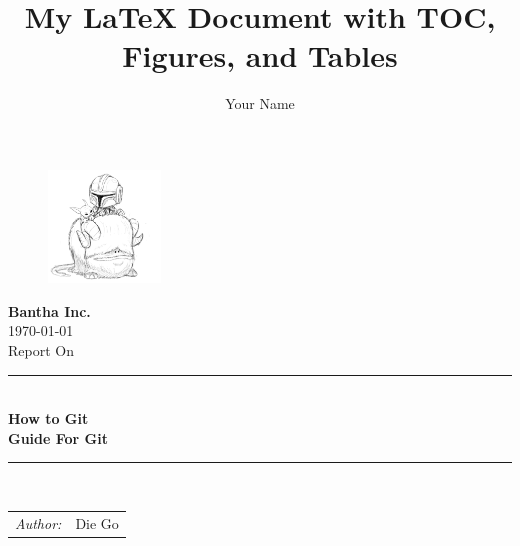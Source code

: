 \documentclass{article} %
\title{My LaTeX Document with TOC, Figures, and Tables}
\author{Your Name}
\begin{document}

\clearpage
{}
\setcounter{page}{1}

\begin{figure}
	\centering
	\includegraphics[width=3cm]{Fun_pics/bantha_inc.jpg}
\end{figure}

\begin{center}
	\textbf{\LARGE Bantha Inc.} \\
	\vspace{1cm}
	\Large \today \\
	\vspace{0.3cm}
	\large Report  On\\

	\rule{\linewidth}{0.5pt} \\
	\vspace{0.2cm}
	\textbf{\LARGE How to Git \\ \vspace{0.3cm} \large Guide For Git} \\
	\vspace{0.1cm}
	\rule{\linewidth}{0.5pt} \\

	\vspace{1.5cm}

	\begin{tabular}{lr}
		\textit{Author:} & Die Go \\
	\end{tabular}

	\vspace{1cm}
	\date{}
\end{center}




\newpage
{}
\setcounter{page}{2}  %
\tableofcontents

\newpage
{}
\setcounter{page}{3}  %
\listoffigures

\newpage
{}
\setcounter{page}{4}  %
\listoftables

\newpage
{}
\setcounter{page}{1}
\end{document}
